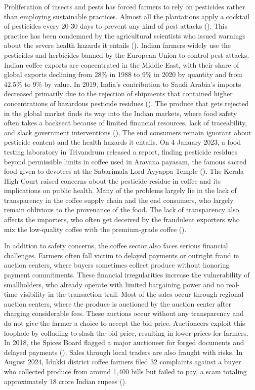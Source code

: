 \documentclass[12pt]{article}
\begin{document}
	Proliferation of insects and pests has forced farmers to rely on pesticides rather than employing sustainable practices. Almost all the plantations apply a cocktail of pesticides every 20-30 days to prevent any kind of pest attacks (\citet{reshma_prevalence_2020}). This practice has been condemned by the agricultural scientists who issued warnings about the severe health hazards it entails (\citet{kuruvila_product_2022}). Indian farmers widely use the pesticides and herbicides banned by the European Union to control pest attacks. Indian coffee exports are concentrated in the Middle East, with their share of global exports declining from 28\% in 1988 to 9\% in 2020 by quantity and from 42.5\% to 9\% by value. In 2019, India's contribution to Saudi Arabia's imports decreased primarily due to the rejection of shipments that contained higher concentrations of hazardous pesticide residues (\citet{nafeesa_pesticide_2024}). The produce that gets rejected in the global market finds its way into the Indian markets, where food safety often takes a backseat because of limited financial resources, lack of traceability, and slack government interventions (\citet{thomas_case_2024}). The end consumers remain ignorant about pesticide content and the health hazards it entails. On 4 January 2023, a food testing laboratory in Trivandrum released a report, finding pesticide residues beyond permissible limits in coffee used in Aravana payasam, the famous sacred food given to devotees at the Sabarimala Lord Ayyappa Temple (\citet{express_news_service_kerala_2023}). The Kerala High Court raised concerns about the pesticide residue in coffee and its implications on public health. Many of the problems largely lie in the lack of transparency in the coffee supply chain and the end consumers, who largely remain oblivious to the provenance of the food. The lack of transparency also affects the importers, who often get deceived by the fraudulent exporters who mix the low-quality coffee with the premium-grade coffee (\citet{mohiuddin_health_2019}). 
	
	In addition to safety concerns, the coffee sector also faces serious financial challenges. Farmers often fall victim to delayed payments or outright fraud in auction centers, where buyers sometimes collect produce without honoring payment commitments. These financial irregularities increase the vulnerability of smallholders, who already operate with limited bargaining power and no real-time visibility in the transaction trail. Most of the sales occur through regional auction centers, where the produce is auctioned by the auction center after charging considerable fees. These auctions occur without any transparency and do not give the farmer a choice to accept the bid price. Auctioneers exploit this loophole by colluding to slash the bid price, resulting in lower prices for farmers. In 2018, the Spices Board flagged a major auctioneer for forged documents and delayed payments (\citet{express_news_service_buyer_2024}). Sales through local traders are also fraught with risks. In August 2024, Idukki district coffee farmers filed 32 complaints against a buyer who collected produce from around 1,400 bills but failed to pay, a scam totaling approximately 18 crore Indian rupees (\citet{express_news_service_buyer_2024}).
	
\end{document}
